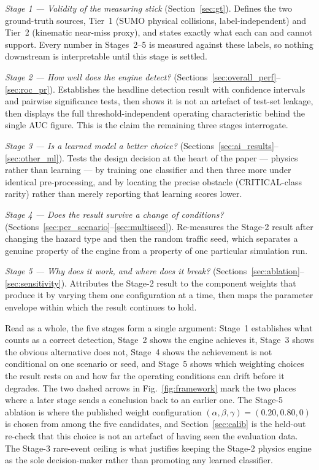 \documentclass[sn-mathphys-num,Numbered,iicol]{sn-jnl}
\begin{document}
\medskip\noindent
\emph{Stage 1 --- Validity of the measuring stick} (Section~\ref{sec:gt}). Defines the two ground-truth sources, Tier~1 (SUMO physical collisions, label-independent) and Tier~2 (kinematic near-miss proxy), and states exactly what each can and cannot support. Every number in Stages~2--5 is measured against these labels, so nothing downstream is interpretable until this stage is settled.

\medskip\noindent
\emph{Stage 2 --- How well does the engine detect?} (Sections~\ref{sec:overall_perf}--\ref{sec:roc_pr}). Establishes the headline detection result with confidence intervals and pairwise significance tests, then shows it is not an artefact of test-set leakage, then displays the full threshold-independent operating characteristic behind the single AUC figure. This is the claim the remaining three stages interrogate.

\medskip\noindent
\emph{Stage 3 --- Is a learned model a better choice?} (Sections~\ref{sec:ai_results}--\ref{sec:other_ml}). Tests the design decision at the heart of the paper --- physics rather than learning --- by training one classifier and then three more under identical pre-processing, and by locating the precise obstacle (CRITICAL-class rarity) rather than merely reporting that learning scores lower.

\medskip\noindent
\emph{Stage 4 --- Does the result survive a change of conditions?} (Sections~\ref{sec:per_scenario}--\ref{sec:multiseed}). Re-measures the Stage-2 result after changing the hazard type and then the random traffic seed, which separates a genuine property of the engine from a property of one particular simulation run.

\medskip\noindent
\emph{Stage 5 --- Why does it work, and where does it break?} (Sections~\ref{sec:ablation}--\ref{sec:sensitivity}). Attributes the Stage-2 result to the component weights that produce it by varying them one configuration at a time, then maps the parameter envelope within which the result continues to hold.

\medskip\noindent
Read as a whole, the five stages form a single argument: Stage~1 establishes what counts as a correct detection, Stage~2 shows the engine achieves it, Stage~3 shows the obvious alternative does not, Stage~4 shows the achievement is not conditional on one scenario or seed, and Stage~5 shows which weighting choices the result rests on and how far the operating conditions can drift before it degrades. The two dashed arrows in Fig.~\ref{fig:framework} mark the two places where a later stage sends a conclusion back to an earlier one. The Stage-5 ablation is where the published weight configuration $(\alpha, \beta, \gamma) = (0.20, 0.80, 0)$ is chosen from among the five candidates, and Section~\ref{sec:calib} is the held-out re-check that this choice is not an artefact of having seen the evaluation data. The Stage-3 rare-event ceiling is what justifies keeping the Stage-2 physics engine as the sole decision-maker rather than promoting any learned classifier.
\end{document}
